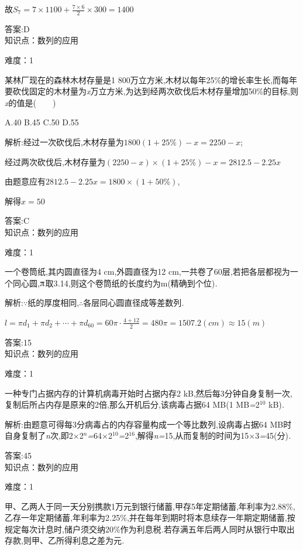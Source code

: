 \documentclass{article} %
\begin{document}
故$S_7=7\times 1100+\frac{7\times 6}{2}\times 300=1400$

 答案:D \\

知识点：数列的应用

难度：1

 某林厂现在的森林木材存量是1 800万立方米,木材以每年25\%的增长率生长,而每年要砍伐固定的木材量为\textit{x}万立方米,为达到经两次砍伐后木材存量增加50\%的目标,则\textit{x}的值是(\textit{　　})

 A.40 B.45 C.50 D.55

 解析:经过一次砍伐后,木材存量为$1800(1+25\%)-x=2250-x$;

经过两次砍伐后,木材存量为$(2250-x)\times (1+25\%)-x=2812.5-2.25x$

由题意应有$2812.5-2.25x=1800\times (1+50\%)$,

解得$x=50$

 答案:C \\

知识点：数列的应用

难度：1

 一个卷筒纸,其内圆直径为4 cm,外圆直径为12 cm,一共卷了60层,若把各层都视为一个同心圆,$\piup$取3\textit{.}14,则这个卷筒纸的长度约为\textit{\underbar{　　　　　}}m(精确到个位)\textit{.~}

 解析:\textit{$\because$}纸的厚度相同,\textit{$\therefore$}各层同心圆直径成等差数列\textit{.}

$l=\pi d_1+\pi d_2+\cdots +\pi d_{60}=60\pi \cdot \frac{4+12}{2}=480\pi =1507.2(cm)\approx 15(m)$

 答案:15 \\

知识点：数列的应用

难度：1

 一种专门占据内存的计算机病毒开始时占据内存2 kB,然后每3分钟自身复制一次,复制后所占内存是原来的2倍,那么开机后\textit{\underbar{　　　}}分,该病毒占据64 MB(1 MB\textit{=}2${}^{10}$ kB)\textit{.~}

 解析:由题意可得每3分病毒占的内存容量构成一个等比数列,设病毒占据64 MB时自身复制了\textit{n}次,即2\textit{$\times$}2\textit{${}^{n}$=}64\textit{$\times$}2${}^{10}$\textit{=}2${}^{16}$,解得\textit{n=}15,从而复制的时间为15\textit{$\times$}3\textit{=}45(分)\textit{.}

 答案:45 \\

知识点：数列的应用

难度：1

 甲、乙两人于同一天分别携款1万元到银行储蓄,甲存5年定期储蓄,年利率为2\textit{.}88\%,乙存一年定期储蓄,年利率为2\textit{.}25\%,并在每年到期时将本息续存一年期定期储蓄,按规定每次计息时,储户须交纳20\%作为利息税\textit{.}若存满五年后两人同时从银行中取出存款,则甲、乙所得利息之差为\textit{\underbar{　　　　　}}元\textit{.~}
\end{document}
